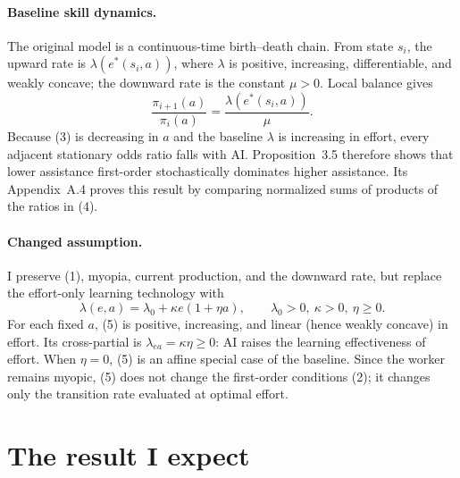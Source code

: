 \documentclass[11pt]{article}
\begin{document}
\paragraph{Baseline skill dynamics.}
The original model is a continuous-time birth--death chain. From state $s_i$,
the upward rate is $\lambda(e^*(s_i,a))$, where $\lambda$ is positive,
increasing, differentiable, and weakly concave; the downward rate is the
constant $\mu>0$. Local balance gives
\begin{equation}
 \frac{\pi_{i+1}(a)}{\pi_i(a)}
 =\frac{\lambda(e^*(s_i,a))}{\mu}.                  \label{eq:odds}
\end{equation}
Because (3) is decreasing in $a$ and the baseline $\lambda$ is increasing in
effort, every adjacent stationary odds ratio falls with AI. Proposition~3.5
therefore shows that lower assistance first-order stochastically dominates
higher assistance. Its Appendix~A.4 proves this result by comparing normalized
sums of products of the ratios in (4).

\paragraph{Changed assumption.}
I preserve (1), myopia, current production, and the downward rate, but replace
the effort-only learning technology with
\begin{equation}
 \lambda(e,a)=\lambda_0+\kappa e(1+\eta a),
 \qquad \lambda_0>0,\ \kappa>0,\ \eta\geq0.         \label{eq:learning}
\end{equation}
For each fixed $a$, (5) is positive, increasing, and linear (hence weakly
concave) in effort. Its cross-partial is $\lambda_{ea}=\kappa\eta\geq0$: AI
raises the learning effectiveness of effort. When $\eta=0$, (5) is an affine
special case of the baseline. Since the worker remains myopic, (5) does not
change the first-order conditions (2); it changes only the transition rate
evaluated at optimal effort.

\section{The result I expect}
\end{document}
